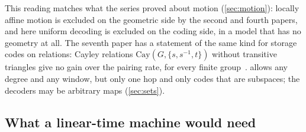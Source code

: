 This reading matches what the series proved about motion (\cref{sec:motion}): locally affine motion is excluded on the
geometric side by the second and fourth papers, and here uniform decoding is excluded on the coding side, in a model
that has no geometry at all. The seventh paper has a statement of the same kind for storage codes on relations: Cayley
relations $\mathrm{Cay}(G,\{s,s^{-1},t\})$ without transitive triangles give no gain over the pairing rate, for every
finite group~\cite[Corollary~5.12]{SeventhPaper2026}.  allows any degree and any window, but only one hop and only codes
that are subspaces; the decoders may be arbitrary maps (\cref{sec:sets}).

\subsection{What a linear-time machine would need}\label{sec:would-need}

